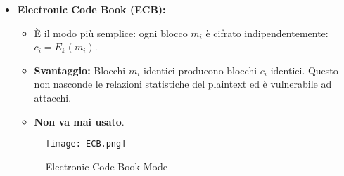 \documentclass[../main.tex]{subfiles}
\begin{document}
\begin{itemize}
	\item \textbf{Electronic Code Book (ECB):}
	      \begin{itemize}
	      	\item È il modo più semplice: ogni blocco $m_i$ è cifrato indipendentemente: $c_i = E_k(m_i)$.
	      	\item \textbf{Svantaggio:} Blocchi $m_i$ identici producono blocchi $c_i$ identici. Questo non nasconde le relazioni statistiche del plaintext ed è vulnerabile ad attacchi.
	      	\item \textbf{Non va mai usato}.
	      \end{itemize}
	                
	      \begin{figure}[H]
	      	\centering
	      	\texttt{[image: ECB.png]}
	      	\caption{Electronic Code Book Mode}
	      	\label{fig:etichetta}
	      \end{figure}
	           

\end{itemize}
\end{document}
